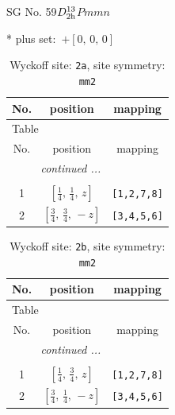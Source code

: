 \documentclass[fleqn,8pt]{jsarticle}
\begin{document}
\setcounter{MaxMatrixCols}{32}

\renewcommand{\tablename}{Table~}
\renewcommand{\figurename}{Figure~}
\begin{center}
\LARGE
SG No. 59\quad$D_{\rm 2h}^{13}$\quad$Pmmn$\quad[ orthorhombic ]
\end{center}
* plus set:\,\,\,$+\left[ 0,\, 0,\, 0 \right]$
\renewcommand{\arraystretch}{1.2}
\begin{longtable}{ccc}
\caption{Wyckoff site: {\tt 2a}, site symmetry: {\tt mm2}}
 \\
 \hline \hline
No. & position & mapping \\ \hline \endfirsthead

\multicolumn{2}{l}{\tablename\ \thetable{}} \\
 \hline \hline
No. & position & mapping \\ \hline \endhead

 \hline \hline
\multicolumn{2}{r}{\footnotesize\it continued ...} \\ \endfoot

 \hline \hline
\multicolumn{2}{r}{} \\ \endlastfoot

1 & $\left[ \frac{1}{4},\, \frac{1}{4},\, z \right]$ & {\tt [1,2,7,8]} \\ \hline
2 & $\left[ \frac{3}{4},\, \frac{3}{4},\, - z \right]$ & {\tt [3,4,5,6]} \\
\end{longtable}
\renewcommand{\arraystretch}{1.2}
\begin{longtable}{ccc}
\caption{Wyckoff site: {\tt 2b}, site symmetry: {\tt mm2}}
 \\
 \hline \hline
No. & position & mapping \\ \hline \endfirsthead

\multicolumn{2}{l}{\tablename\ \thetable{}} \\
 \hline \hline
No. & position & mapping \\ \hline \endhead

 \hline \hline
\multicolumn{2}{r}{\footnotesize\it continued ...} \\ \endfoot

 \hline \hline
\multicolumn{2}{r}{} \\ \endlastfoot

1 & $\left[ \frac{1}{4},\, \frac{3}{4},\, z \right]$ & {\tt [1,2,7,8]} \\ \hline
2 & $\left[ \frac{3}{4},\, \frac{1}{4},\, - z \right]$ & {\tt [3,4,5,6]} \\
\end{longtable}
\end{document}

